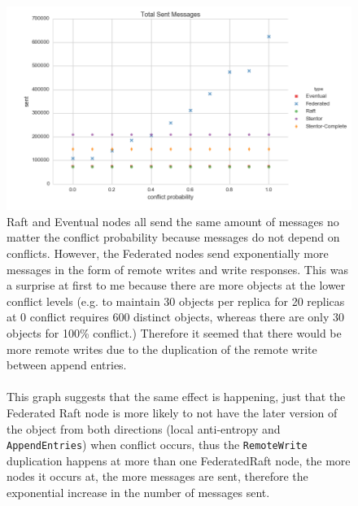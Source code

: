 \documentclass[11pt,letterpaper]{article}
\begin{document}
\begin{figure}[!h]
    \centering
        \includegraphics[width=\textwidth]{figures/messages_sent.png}
        \caption{\textsf{Raft and Eventual nodes all send the same amount of messages no matter the conflict probability because messages do not depend on conflicts. However, the Federated nodes send exponentially more messages in the form of remote writes and write responses. This was a surprise at first to me because there are more objects at the lower conflict levels (e.g. to maintain 30 objects per replica for 20 replicas at 0 conflict requires 600 distinct objects, whereas there are only 30 objects for 100\% conflict.) Therefore it seemed that there would be more remote writes due to the duplication of the remote write between append entries.\\
\\
        This graph suggests that the same effect is happening, just that the Federated Raft node is more likely to not have the later version of the object from both directions (local anti-entropy and \texttt{AppendEntries}) when conflict occurs, thus the \texttt{RemoteWrite} duplication happens at more than one FederatedRaft node, the more nodes it occurs at, the more messages are sent, therefore the exponential increase in the number of messages sent.}}
        \label{fig:messages_sent}
\end{figure}
\end{document}
